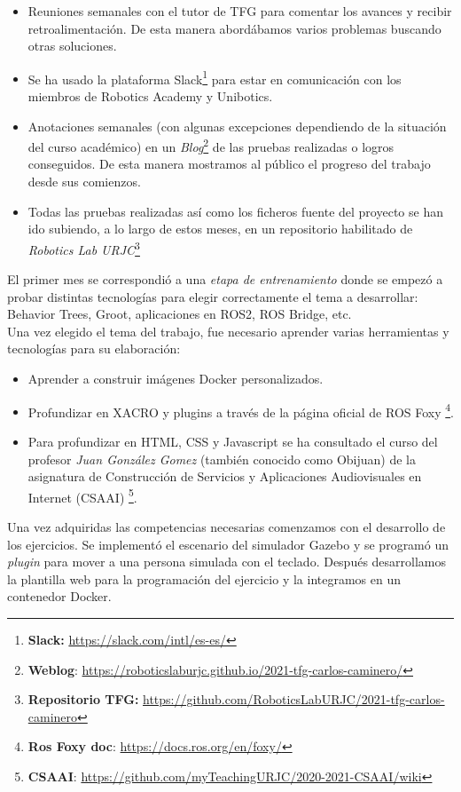 \begin{itemize}
	\item Reuniones semanales con el tutor de TFG para comentar los avances y recibir retroalimentación. De esta manera abordábamos varios problemas buscando otras soluciones.
	\item Se ha usado la plataforma Slack\footnote{\textbf{Slack:} \url{https://slack.com/intl/es-es/}} para estar en comunicación con los miembros de Robotics Academy y Unibotics.
	\item Anotaciones semanales (con algunas excepciones dependiendo de la situación del curso académico) en un \textit{Blog}\footnote{\textbf{Weblog}: \url{https://roboticslaburjc.github.io/2021-tfg-carlos-caminero/}} de las pruebas realizadas o logros conseguidos. De esta manera mostramos al público el progreso del trabajo desde sus comienzos.
	\item Todas las pruebas realizadas así como los ficheros fuente del proyecto se han ido subiendo, a lo largo de estos meses, en un repositorio habilitado de \textit{Robotics Lab URJC}\footnote{\textbf{Repositorio TFG:} \url{https://github.com/RoboticsLabURJC/2021-tfg-carlos-caminero}}
\end{itemize}

El primer mes se correspondió a una \textit{etapa de entrenamiento} donde se empezó a probar distintas tecnologías para elegir correctamente el tema a desarrollar: Behavior Trees, Groot, aplicaciones en ROS2, ROS Bridge, etc.\\

Una vez elegido el tema del trabajo, fue necesario aprender varias herramientas y tecnologías para su elaboración:
\begin{itemize}
	\item Aprender a construir imágenes Docker personalizados.
	\item Profundizar en XACRO y plugins a través de la página oficial de ROS Foxy \footnote{\textbf{Ros Foxy doc}: \url{https://docs.ros.org/en/foxy/}}.
	\item Para profundizar en HTML, CSS y Javascript se ha consultado el curso del profesor \textit{Juan González Gomez} (también conocido como Obijuan) de la asignatura de Construcción de Servicios y Aplicaciones Audiovisuales en Internet (CSAAI) \footnote{\textbf{CSAAI}: \url{https://github.com/myTeachingURJC/2020-2021-CSAAI/wiki}}.
\end{itemize}

Una vez adquiridas las competencias necesarias comenzamos con el desarrollo de los ejercicios. Se implementó el escenario del simulador Gazebo y se programó un \textit{plugin} para mover a una persona simulada con el teclado. Después desarrollamos la plantilla web para la programación del ejercicio y la integramos en un contenedor Docker.\\

